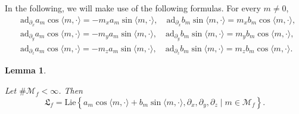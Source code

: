 \documentclass[10pt]{article}
\newcommand{\p}{\partial}
\newcommand{\R}{{\mathbb R}}
\newcommand{\M}{{\mathcal M}}
\newcommand{\la}{\langle}
\newcommand{\ra}{\rangle}
\newcommand{\ad}{\text{ad}}
\newtheorem{lemma}{Lemma}
\begin{document}
\\ \\
In the following, we will make use of the following formulas. For every $m \neq 0$,
\begin{align*}
    &\ad_{\p_x}a_m\cos\la m,\cdot \ra=-m_xa_m\sin \la m,\cdot \ra, \quad \ad_{\p_x}b_m\sin\la m,\cdot\ra=m_xb_m\cos \la m,\cdot \ra,\\
    &\ad_{\p_y}a_m\cos\la m,\cdot \ra=-m_ya_m\sin \la m,\cdot \ra,\quad \ad_{\p_y}b_m\sin\la m,\cdot\ra=m_yb_m\cos \la m,\cdot \ra,\\
    &\ad_{\p_z}a_m\cos\la m,\cdot \ra=-m_za_m\sin \la m,\cdot \ra, \quad \ad_{\p_z}b_m\sin\la m,\cdot\ra=m_zb_m\cos \la m,\cdot \ra. 
\end{align*}

\begin{lemma} \label{lemma canceled modes dim3}

Let $\# \M_f < \infty$. Then
    \begin{equation*}
        \mathfrak{L}_f=\mathrm{Lie}\left\{a_m\cos \la m,\cdot \ra + b_m\sin \la m,\cdot \ra,\p_x,\p_y,\p_z \mid m \in \M_f\right\}.
    \end{equation*}
\end{lemma}
\end{document}
